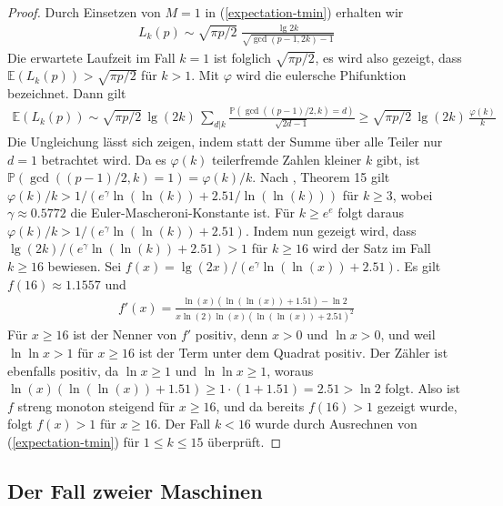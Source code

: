 \documentclass[a4paper, 11pt, ngerman]{article}
\newcommand{\E}{\mathbb{E}}
\renewcommand{\P}{\mathbb{P}}
\begin{document}
\begin{proof}
    Durch Einsetzen von $M = 1$ in (\ref{expectation-tmin}) erhalten wir
    \begin{align*}
        L_k(p) \sim \sqrt {\pi p / 2} \;
        \frac {\lg 2k} {\sqrt{\gcd(p - 1, 2k) - 1}}
    \end{align*}
    Die erwartete Laufzeit im Fall $k = 1$ ist folglich $\sqrt{\pi p/2}$, es wird also gezeigt, dass $\E(L_k(p)) > \sqrt{\pi p / 2}$ für $k > 1$. Mit $\varphi$ wird die eulersche Phifunktion bezeichnet. Dann gilt
    \begin{align*}
        \E(L_k(p))
        \sim \sqrt{\pi p / 2} \, \lg (2k) \,
        \sum_{d | k} \frac {\P(\gcd((p - 1)/2, k) = d)}
        { \sqrt {2d - 1}} \nonumber
        \ge \sqrt{\pi p / 2} \, \lg (2k) \, \frac {\varphi(k)} k
    \end{align*}
    Die Ungleichung lässt sich zeigen, indem statt der Summe über alle Teiler nur $d = 1$ betrachtet wird. Da es $\varphi(k)$ teilerfremde Zahlen kleiner $k$ gibt, ist $\P(\gcd((p - 1)/2, k) = 1) = \varphi(k)/k$. Nach \cite{rs62}, Theorem 15 gilt $ \varphi(k) / k > 1 / (e^\gamma \ln (\ln (k)) + 2.51 / \ln (\ln (k)))$ für $k \ge 3$, wobei $\gamma \approx 0.5772$ die Euler-Mascheroni-Konstante ist. Für $k \ge e^e$ folgt daraus $\varphi(k) / k > 1/(e^\gamma \ln(\ln(k)) + 2.51)$. Indem nun gezeigt wird, dass $\lg (2k) / (e^\gamma \ln (\ln (k)) + 2.51) > 1$ für $k \ge 16$ wird der Satz im Fall $k \ge 16$ bewiesen. Sei $f(x) = \lg (2x) / (e^\gamma \ln (\ln (x)) + 2.51)$. Es gilt $f(16) \approx 1.1557$ und
    \begin{align*}
        f'(x)
        = \frac {\ln (x)(\ln (\ln (x)) + 1.51) - \ln 2}
        {x \ln (2) \ln (x)(\ln(\ln(x)) + 2.51)^2}
    \end{align*}
    Für $x \ge 16$ ist der Nenner von $f'$ positiv, denn $x > 0$ und $\ln x > 0$, und weil $\ln \ln x > 1$ für $x \ge 16$ ist der Term unter dem Quadrat positiv. Der Zähler ist ebenfalls positiv, da $\ln x \ge 1$ und $\ln \ln x \ge 1$, woraus $\ln(x)(\ln(\ln(x)) + 1.51) \ge 1 \cdot (1 + 1.51) = 2.51 > \ln 2$ folgt. Also ist $f$ streng monoton steigend für $x \ge 16$, und da bereits $f(16) > 1$ gezeigt wurde, folgt $f(x) > 1$ für $x \ge 16$. Der Fall $k < 16$ wurde durch Ausrechnen von (\ref{expectation-tmin}) für $1 \le k \le 15$ überprüft.
\end{proof}

\subsection{Der Fall zweier Maschinen}
\end{document}
